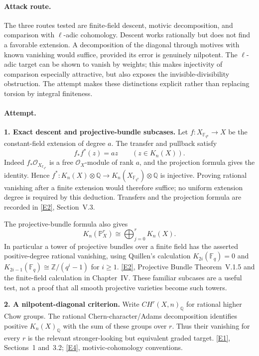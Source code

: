 \documentclass[11pt,a4paper]{article}
\newcommand{\Z}{\mathbb{Z}}
\newcommand{\Q}{\mathbb{Q}}
\newcommand{\F}{\mathbb{F}}
\newcommand{\PP}{\mathbb P}
\newcommand{\eref}[2]{\hyperlink{extra:#1:#2}{[E#2]}}
\numberwithin{equation}{section}
\begin{document}
\paragraph{Attack route.}
The three routes tested are finite-field descent, motivic decomposition,
and comparison with $\ell$-adic cohomology. Descent works rationally but
does not find a favorable extension. A decomposition of the diagonal
through motives with known vanishing would suffice, provided its error
is genuinely nilpotent. The $\ell$-adic target can be shown to vanish by
weights; this makes injectivity of comparison especially attractive,
but also exposes the invisible-divisibility obstruction. The attempt
makes these distinctions explicit rather than replacing torsion by
integral finiteness.

\paragraph{Attempt.}
\textbf{1. Exact descent and projective-bundle subcases.}
Let $f:X_{\F_{q^a}}\to X$ be the constant-field extension of degree $a$.
The transfer and pullback satisfy
\[
 f_*f^*(z)=a z\qquad(z\in K_n(X)).
\]
Indeed $f_*\mathcal O_{X_{\F_{q^a}}}$ is a free $\mathcal O_X$-module
of rank $a$, and the projection formula gives the identity. Hence
$f^*:K_n(X)\otimes\Q\to K_n(X_{\F_{q^a}})\otimes\Q$ is injective.
Proving rational vanishing after a finite extension would therefore
suffice; no uniform extension degree is required by this deduction.
Transfers and the projection formula are recorded in \eref{222}{2},
Section~V.3.

The projective-bundle formula also gives
\[
 K_n(\PP^r_X)\cong\bigoplus_{j=0}^r K_n(X).
\]
In particular a tower of projective bundles over a finite field has the
asserted positive-degree rational vanishing, using Quillen's calculation
$K_{2i}(\F_q)=0$ and
$K_{2i-1}(\F_q)\cong\Z/(q^i-1)$ for $i\ge1$.
\eref{222}{2}, Projective Bundle Theorem~V.1.5 and the finite-field
calculation in Chapter~IV. These familiar subcases are a useful test,
not a proof that all smooth projective varieties become such towers.

\textbf{2. A nilpotent-diagonal criterion.}
Write $CH^r(X,n)_{\Q}$ for rational higher Chow groups. The rational
Chern-character/Adams decomposition identifies positive $K_n(X)_{\Q}$
with the sum of these groups over $r$. Thus their vanishing for every
$r$ is the relevant stronger-looking but equivalent graded target.
\eref{222}{1}, Sections~1 and~3.2; \eref{222}{4}, motivic-cohomology
conventions.
\end{document}
